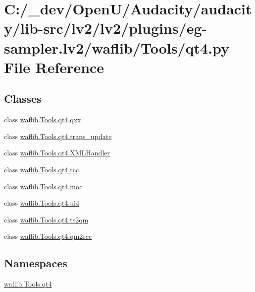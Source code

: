 \hypertarget{lv2_2plugins_2eg-sampler_8lv2_2waflib_2_tools_2qt4_8py}{}\section{C\+:/\+\_\+dev/\+Open\+U/\+Audacity/audacity/lib-\/src/lv2/lv2/plugins/eg-\/sampler.lv2/waflib/\+Tools/qt4.py File Reference}
\label{lv2_2plugins_2eg-sampler_8lv2_2waflib_2_tools_2qt4_8py}
\subsection*{Classes}
\begin{DoxyCompactItemize}
\item 
class \hyperlink{classwaflib_1_1_tools_1_1qt4_1_1qxx}{waflib.\+Tools.\+qt4.\+qxx}
\item 
class \hyperlink{classwaflib_1_1_tools_1_1qt4_1_1trans__update}{waflib.\+Tools.\+qt4.\+trans\+\_\+update}
\item 
class \hyperlink{classwaflib_1_1_tools_1_1qt4_1_1_x_m_l_handler}{waflib.\+Tools.\+qt4.\+X\+M\+L\+Handler}
\item 
class \hyperlink{classwaflib_1_1_tools_1_1qt4_1_1rcc}{waflib.\+Tools.\+qt4.\+rcc}
\item 
class \hyperlink{classwaflib_1_1_tools_1_1qt4_1_1moc}{waflib.\+Tools.\+qt4.\+moc}
\item 
class \hyperlink{classwaflib_1_1_tools_1_1qt4_1_1ui4}{waflib.\+Tools.\+qt4.\+ui4}
\item 
class \hyperlink{classwaflib_1_1_tools_1_1qt4_1_1ts2qm}{waflib.\+Tools.\+qt4.\+ts2qm}
\item 
class \hyperlink{classwaflib_1_1_tools_1_1qt4_1_1qm2rcc}{waflib.\+Tools.\+qt4.\+qm2rcc}
\end{DoxyCompactItemize}
\subsection*{Namespaces}
\begin{DoxyCompactItemize}
\item 
 \hyperlink{namespacewaflib_1_1_tools_1_1qt4}{waflib.\+Tools.\+qt4}
\end{DoxyCompactItemize}
